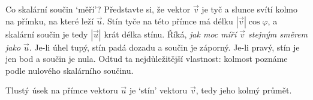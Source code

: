 Co skalární součin `měří'? Představte si, že vektor $\vec{v}$ je tyč a slunce svítí kolmo na přímku, na které leží $\vec{u}$. Stín tyče na této přímce má délku $|\vec{v}|\cos\varphi$, a skalární součin je tedy $|\vec{u}|$ krát délka stínu. Říká, \textit{jak moc míří $\vec{v}$ stejným směrem jako $\vec{u}$}. Je-li úhel tupý, stín padá dozadu a součin je záporný. Je-li pravý, stín je jen bod a součin je nula. Odtud ta nejdůležitější vlastnost: kolmost poznáme podle nulového skalárního součinu.

\begin{center}
\end{center}
Tlustý úsek na přímce vektoru $\vec{u}$ je `stín' vektoru $\vec{v}$, tedy jeho kolmý průmět.


